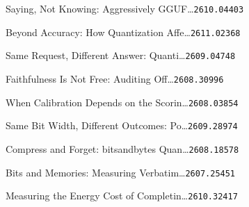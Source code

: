 \begin{refs}
[19] Saying, Not Knowing: Aggressively GGUF\ldots{}\hfill{\texttt{2610.04403}}\par
[20] Beyond Accuracy: How Quantization Affe\ldots{}\hfill{\texttt{2611.02368}}\par
[21] Same Request, Different Answer: Quanti\ldots{}\hfill{\texttt{2609.04748}}\par
[22] Faithfulness Is Not Free: Auditing Off\ldots{}\hfill{\texttt{2608.30996}}\par
[23] When Calibration Depends on the Scorin\ldots{}\hfill{\texttt{2608.03854}}\par
[24] Same Bit Width, Different Outcomes: Po\ldots{}\hfill{\texttt{2609.28974}}\par
[25] Compress and Forget: bitsandbytes Quan\ldots{}\hfill{\texttt{2608.18578}}\par
[26] Bits and Memories: Measuring Verbatim\ldots{}\hfill{\texttt{2607.25451}}\par
[27] Measuring the Energy Cost of Completin\ldots{}\hfill{\texttt{2610.32417}}\par
\end{refs}
\endgroup
